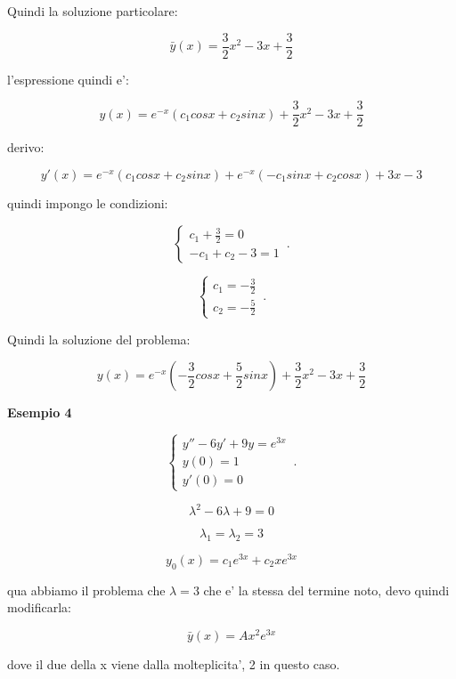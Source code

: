 \documentclass[11pt]{article}
\begin{document}
Quindi la soluzione particolare:

\[
    \bar{y} (x) = \frac{3}{2}x^{2}-3x+\frac{3}{2}
\]


l'espressione quindi e':

\[
    y(x) = e ^{-x}(c_1 cosx + c_2 sinx ) + \frac{3}{2}x^{2}-3x+\frac{3}{2}
\]

derivo:

\[
    y'(x) = e ^{-x}(c_1 cosx+ c_2 sinx) + e ^{-x}(-c_1sinx+c_2 cosx) +3x -3
\]

quindi impongo le condizioni:

    \begin{equation}
        \begin{cases}
            c_1 +\frac{3}{2}=0\\
            -c_1+c_2 -3 = 1
        \end{cases}\,.
    \end{equation}

    \begin{equation}
        \begin{cases}
            c_1=-\frac{3}{2}\\
            c_2=-\frac{5}{2}
        \end{cases}\,.
    \end{equation}

Quindi la soluzione del problema:

\[
    y(x) = e ^{-x}(-\frac{3}{2}cosx + \frac{5}{2} sinx) + \frac{3}{2}x^{2}-3x + \frac{3}{2}
\]

\textbf{Esempio 4} 

    \begin{equation}
        \begin{cases}
            y''-6y' + 9y = e ^{3x}\\
            y(0) = 1\\
            y'(0) = 0
        \end{cases}\,.
    \end{equation}

\[
    \lambda^{2} -6 \lambda + 9 = 0
\]

\[
    \lambda_1=\lambda_2=3
\]

\[
    y_0(x)  = c_1 e ^{3x}+ c_2 x e ^{3x}
\]

qua abbiamo il problema che $\lambda=3$ che e' la stessa del termine noto, devo quindi modificarla:

\[
    \bar{y} (x) = A x^{2}e ^{3x}
\]

dove il due della x viene dalla molteplicita', 2 in questo caso.
\end{document}
